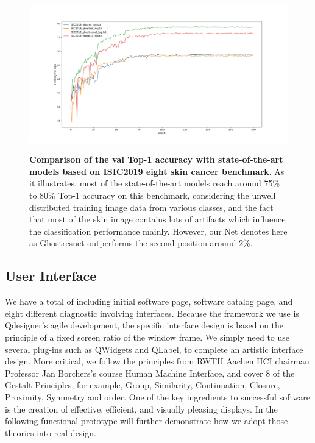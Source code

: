 \begin{figure}[t]
\includegraphics[height=0.4\textheight,width=1\textwidth]{thesis-template-master/images/top1acc.png}
\label{fig:cellnet}
\caption{ \textbf{Comparison of the val Top-1 accuracy with state-of-the-art models based on ISIC2019 eight skin cancer benchmark}. As it illustrates, most of the state-of-the-art models reach around 75\% to 80\% Top-1 accuracy on this benchmark, considering the unwell distributed training image data from various classes, and the fact that most of the skin image contains lots of artifacts which influence the classification performance mainly. However, our Net denotes here as Ghostresnet outperforms the second position around 2\%.}
\end{figure}





\subsection{User Interface} %
\label{sub:amet}
We have a total of including initial software page, software catalog page, and eight different diagnostic involving interfaces. Because the framework we use is Qdesigner’s agile development, the specific interface design is based on the principle of a fixed screen ratio of the window frame. We simply need to use several plug-ins such as QWidgets and QLabel, to complete an artistic interface design. More critical, we follow the principles from RWTH Aachen HCI chairman Professor Jan Borchers's course Human Machine Interface, and cover 8 of the Gestalt Principles, for example, Group, Similarity, Continuation, Closure, Proximity, Symmetry and order. One of the key ingredients to successful software is the creation of effective, efficient, and visually pleasing displays. In the following functional prototype will further demonstrate how we adopt those theories into real design.

